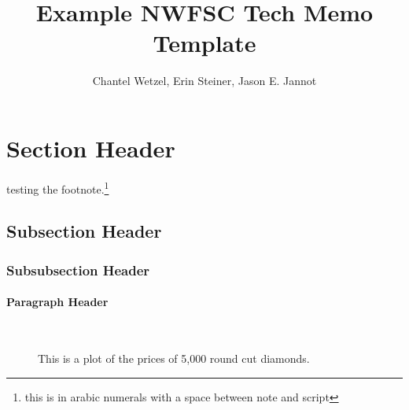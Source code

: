 \documentclass[12pt]{article}
\title{\textcolor[cmyk]{1.00,0.83,0.41,0.36}{Example NWFSC Tech Memo Template}}
\author{Chantel Wetzel, Erin Steiner, Jason E. Jannot}
\newcommand{\paragraphnewline}[1]{\paragraph{#1}\mbox{}\\}
\begin{document}
\maketitle
\tableofcontents
\listoffigures
\normalfont %
\normalsize %

	
\section{Section Header}
\lipsum[1]
testing the footnote.\footnote{this is in arabic numerals with a space between note and script}
\subsection{Subsection Header}
\lipsum[2]
\subsubsection{Subsubsection Header}
\lipsum[3]
\paragraphnewline{Paragraph Header}
\lipsum[4]


\begin{figure}[!h]
\centering
\caption[Prices round cut]{This is a plot of the prices of 5,000 round cut diamonds.}
\label{fig:diamprice5k}
\end{figure}
\end{document}
